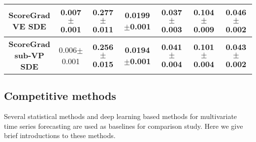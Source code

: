 \begin{table*}[!t]
{\begin{tabular}{|c|cccccc|}
			\hline
			\makecell[c]{\textbf{ScoreGrad}\\ \textbf{VE SDE}}&0.007$\pm$0.001 &0.277$\pm$0.011 &0.0199$\pm$0.001 &\textbf{0.037}$\pm$\textbf{0.003} & 0.104$\pm$0.009& 0.046$\pm$0.002\\
			\hline
			\makecell[c]{\textbf{ScoreGrad}\\ \textbf{sub-VP SDE}}&0.006$\pm$0.001 &\textbf{0.256}$\pm$\textbf{0.015} &\textbf{0.0194}$\pm$\textbf{0.001} &\textbf{0.041}$\pm$\textbf{0.004} &\textbf{0.101}$\pm$\textbf{0.004} & \textbf{0.043}$\pm$\textbf{0.002}\\
			\hline
	\end{tabular}}
\end{table*}

\subsection{Competitive methods}
Several statistical methods and deep learning based methods for multivariate time series forecasting are used as baselines for comparison study. Here we give brief introductions to these methods.
